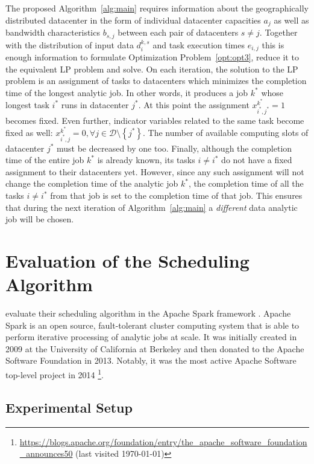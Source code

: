 The proposed Algorithm~\ref{alg:main} requires information about the geographically distributed datacenter in the form of individual datacenter capacities \(a_j\) as well as bandwidth characteristics \(b_{s, j}\) between each pair of datacenters \(s\neq j\). Together with the distribution of input data \(d^{k, s}_i\) and task execution times \(e_{i, j}\) this is enough information to formulate Optimization Problem~\ref{opt:opt3}, reduce it to the equivalent LP problem and solve. On each iteration, the solution to the LP problem is an assignment of tasks to datacenters which minimizes the completion time of the longest analytic job. In other words, it produces a job \(k^*\) whose longest task \(i^*\) runs in datacenter \(j^*\). At this point the assignment \(x^{k^*}_{i^*, j^*} = 1\) becomes fixed. Even further, indicator variables related to the same task become fixed as well: \(x^{k^*}_{i^*, j}=0, \forall j\in\mathcal{D}\setminus \left\{j^*\right\}\). The number of available computing slots of datacenter \(j^*\) must be decreased by one too. Finally, although the completion time of the entire job \(k^*\) is already known, its tasks \(i\neq i^*\) do not have a fixed assignment to their datacenters yet. However, since any such assignment will not change the completion time of the analytic job \(k^*\), the completion time of all the tasks \(i\neq i^*\) from that job is set to the completion time of that job. This ensures that during the next iteration of Algorithm~\ref{alg:main} a \emph{different} data analytic job will be chosen.

\section{Evaluation of the Scheduling Algorithm}

\citet*{Chen2017} evaluate their scheduling algorithm in the Apache Spark framework \cite{Zaharia2012}. Apache Spark is an open source, fault-tolerant cluster computing system that is able to perform iterative processing of analytic jobs at scale. It was initially created in 2009 at the University of California at Berkeley and then donated to the Apache Software Foundation in 2013. Notably, it was the most active Apache Software top-level project in 2014 \footnote{\url{https://blogs.apache.org/foundation/entry/the_apache_software_foundation_announces50} (last visited \today)}.

\subsection{Experimental Setup}

